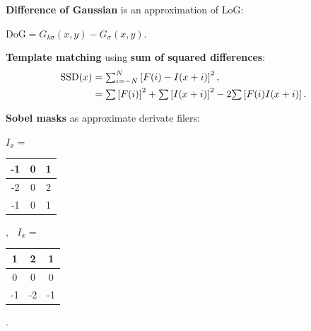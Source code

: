 \documentclass[landscape]{article}
\newcommand{\vmspace}{\vspace{-7pt}}
\newcommand{\vpspace}{\vspace{5pt}}
\begin{document}
\begin{multicols}{3}
\vpspace

\begin{minipage}{\columnwidth}
  \textbf{Difference of Gaussian} is an approximation of LoG:
  \vmspace
  \begin{center}
    $\mathrm{DoG} = G_{k\sigma}(x, y) - G_\sigma(x, y).
    $
  \end{center}
\end{minipage}

\vpspace


\begin{minipage}{\columnwidth}
  \textbf{Template matching} using \textbf{sum of squared differences}:
  \vmspace
  \vspace{-3pt}
  \begin{equation*}
    \begin{split}
      \mathrm{SSD}(x) &= \mathsmaller\sum\nolimits_{i=-N}^N \left[ F(i) - I(x+i)
      \right]^2,\\
      &= \mathsmaller\sum \left[ F(i) \right]^2 +
      \mathsmaller\sum \left[ I(x+i) \right]^2 -
      2 \mathsmaller\sum \left[ F(i) I(x+i) \right].
    \end{split}
  \end{equation*}
\end{minipage}

\vpspace

\begin{minipage}{\columnwidth}
  \textbf{Sobel masks} as approximate derivate filers:
  \vmspace
  \begin{center}
    $I_x =$
    \begin{tabular}{|c|c|c|}\hline
      -1 & 0 & 1 \\\hline
      -2 & 0 & 2 \\\hline
      -1 & 0 & 1 \\\hline
    \end{tabular} ,
    $\;\;I_x =$
    \begin{tabular}{|c|c|c|}\hline
      1 & 2 & 1 \\\hline
      0 & 0 & 0 \\\hline
      -1 & -2 & -1 \\\hline
    \end{tabular} .
  \end{center}
\end{minipage}

\vpspace


\end{multicols}
\end{document}
